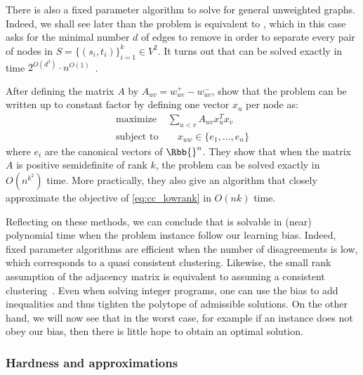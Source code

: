 There is also a fixed parameter algorithm to solve \mind{} for general unweighted graphs. Indeed, we
shall see later than the problem is equivalent to \mmc{}, which in this case asks for the minimal
number $d$ of edges to remove in order to separate every pair of nodes in $S=\{(s_i,t_i)\}_{i=1}^k
\in V^2$. It turns out that \mmc{} can be solved exactly in time $2^{O(d^3)}\cdot
n^{O(1)}$~\autocite{FPAMulticut14}.

After defining the matrix $A$ by $A_{uv} = w_{uv}^+ - w_{uv}^-$, \textcite{LowRank16} show that the
\maxa{} problem can be written up to constant factor by defining one vector $x_u$ per node as:
\begin{align}
   \label{eq:cc_lowrank}
   \text{maximize } & \sum_{u<v} A_{uv}x_u^Tx_v \\
   \text{subject to}& \quad x_{uw} \in \{e_1,\ldots, e_n\} \nonumber
\end{align}
where $e_i$ are the canonical vectors of $\Rbb{}^n$. They show that when the matrix $A$ is positive
semidefinite of rank $k$, the \pcc{} problem can be solved exactly in $O(n^{k^2})$ time. More
practically, they also give an algorithm that closely approximate the objective of
\eqref{eq:cc_lowrank} in $O(nk)$ time.

\bigskip

Reflecting on these methods, we can conclude that \pcc{} is solvable in (near) polynomial time
when the problem instance follow our learning bias. Indeed, fixed parameter algorithms are efficient
when the number of disagreements is low, which corresponds to a quasi consistent clustering.
Likewise, the small rank assumption of the adjacency matrix is equivalent to assuming a consistent
clustering~\autocite[Theorem 13]{LowRankCompletion14}. Even when solving integer programs, one can
use the bias to add inequalities and thus tighten the polytope of admissible solutions. On the other
hand, we will now see that in the worst case, for example if an instance does not obey our bias,
then there is little hope to obtain an optimal solution.

\subsubsection{Hardness and approximations}
\label{ssub:cc_harness_approx}

